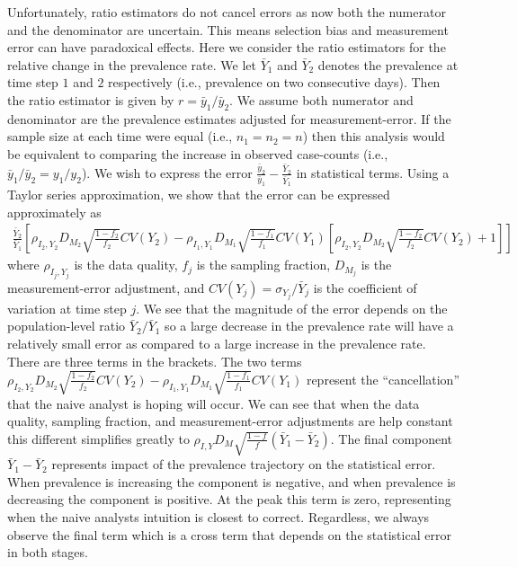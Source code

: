 \documentclass[11pt]{article}
\numberwithin{equation}{section}
\theoremstyle{plain}
\begin{document}
Unfortunately, ratio estimators do not cancel errors as now both the numerator and the denominator are uncertain.  This means selection bias and measurement error can have paradoxical effects.  Here we consider the ratio estimators for the relative change in the prevalence rate.  We let $\bar Y_1$ and $\bar Y_2$ denotes the prevalence at time step $1$ and $2$ respectively (i.e., prevalence on two consecutive days).  Then the ratio estimator is given by $r = \bar y_1 / \bar y_2$.  We assume both numerator and denominator are the prevalence estimates adjusted for measurement-error. If the sample size at each time were equal (i.e., $n_1 = n_2 = n$) then this analysis would be equivalent to comparing the increase in observed case-counts (i.e., $\bar y_1/\bar y_2 = y_1/y_2$).  We wish to express the error $\frac{\bar y_2}{\bar y_1} - \frac{\bar Y_2}{\bar Y_1}$ in statistical terms.  Using a Taylor series approximation, we show that the error can be expressed approximately as
$$
\begin{aligned}
\frac{\bar Y_2}{\bar Y_1} \left[ \rho_{I_2, Y_2} D_{M_2} \sqrt{\frac{1-f_2}{f_2}} CV(Y_2)  - \rho_{I_1,Y_1} D_{M_1} \sqrt{\frac{1-f_1}{f_1}} CV (Y_1) \left[ \rho_{I_2, Y_2} D_{M_2} \sqrt{\frac{1-f_2}{f_2}} CV(Y_2) + 1 \right] \right]
\end{aligned}
$$
where $\rho_{I_j, Y_j}$ is the data quality, $f_j$ is the sampling fraction, $D_{M_j}$ is the measurement-error adjustment, and $CV(Y_j) = \sigma_{Y_j}/\bar Y_j$ is the coefficient of variation at time step $j$.  We see that the magnitude of the error depends on the population-level ratio $\bar Y_2 / \bar Y_1$ so a large decrease in the prevalence rate will have a relatively small error as compared to a large increase in the prevalence rate. There are three terms in the brackets.  The two terms $\rho_{I_2, Y_2} D_{M_2} \sqrt{\frac{1-f_2}{f_2}} CV(Y_2) - \rho_{I_1, Y_1} D_{M_1} \sqrt{\frac{1-f_1}{f_1}} CV(Y_1)$  represent the ``cancellation'' that the naive analyst is hoping will occur.  We can see that when the data quality, sampling fraction, and measurement-error adjustments are help constant this different simplifies greatly to $\rho_{I,Y} D_M \sqrt{\frac{1-f}{f}} ( \bar Y_1 - \bar Y_2)$. The final component $\bar Y_1 - \bar Y_2$ represents impact of the prevalence trajectory on the statistical error.  When prevalence is increasing the component is negative, and when prevalence is decreasing the component is positive. At the peak this term is zero, representing when the naive analysts intuition is closest to correct.  Regardless, we always observe the final term which is a cross term that depends on the statistical error in both stages.
\end{document}
